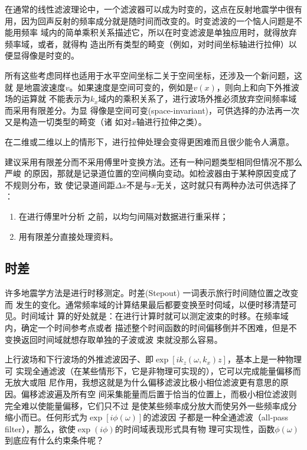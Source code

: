 在通常的线性滤波理论中，一个滤波器可以成为时变的，这点在反射地震学中很有
用，因为回声反射的频率成分就是随时间而改变的。时变滤波的一个恼人问题是不能用频率
域内的简单乘积关系描述它，所以在时变滤波是单独应用时，就得放弃频率域，或者，就得构
造出所有类型的畸变（例如，对时间坐标轴进行拉伸）以便显得像是时变的。

所有这些考虑同样也适用于水平空间坐标二关于空间坐标，还涉及一个新问题，这就
是地震波速度$v$。如果速度是空间可变的，例如是$v(x)$，则向上和向下外推波场的运算就
不能表示为$k_x$域内的乘积关系了，进行波场外推必须放弃空间频率域而采用有限差分。为显
得像是空间可变(space-invariant)，可供选择的办法再一次又是构造一切类型的畸变（诸
如对$x$轴进行拉伸之类）。

在二维或二维以上的情形下，进行拉伸处理会变得更困难而且很少能令人满意。

建议采用有限差分而不采用傅里叶变换方法。还有一种问题类型相同但情况不那么严峻
的原因，那就是记录道位置的空间横向变动。如检波器由于某种原因变成了不规则分布，致
使记录道间距$\Delta x$不是与$x$无关，这时就只有两种办法可供选择了 ：
\begin{enumerate}
\item 在进行傅里叶分析
之前，以均匀间隔对数据进行重采样；
\item 用有限差分直接处理资料。
\end{enumerate}

\subsection{时差}
\label{sec:2.0.2}

许多地震学方法是进行时移测定。时差(Stepout)
一词表示旅行时间随位置之改变而
发生的变化。通常频率域的计算结果最后都要变换至时伺域，以便时移清楚可见。时间域计
算的好处就是：在进行计算时就可以测定波束的时移。在频率域内，确定一个时间参考点或者
描述整个时间函数的时间偏移倒并不困难，但是不变换返回时间域就想存取单独的子波或波
束就没那么容易。

上行波场和下行波场的外推滤波因子、即$\exp[ik_z(\omega,k_x)z]$，基本上是一种物理可
实现全通滤波（在某些情形下，它是非物理可实现的），它可以完成能量偏移而无放大或阻
尼作用，我想这就是为什么偏移滤波比极小相位滤波更有意思的原因。偏移滤波遍及所有空
间采集能量而后置于恰当的位置上，而极小相位滤波则完全难以使能量偏移，它们只不过
是使某些频率成分放大而使另外一些频率成分缩小而已。任何形式为$\exp[i\phi(\omega)]$的滤波因
子都是一种全通滤波（all-pass filter），那么，欲使$\exp (i\phi)$的时间域表现形式具有物
理可实现性，函数$\phi(\omega)$到底应有什么约束条件呢？

